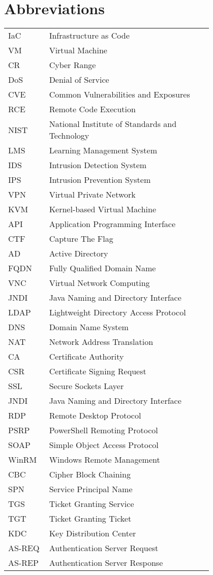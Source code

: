 \chapter*{Abbreviations}

\begin{flushleft}
\begin{tabular}{l p{0.8\linewidth}}
IaC      & Infrastructure as Code\\
VM       & Virtual Machine\\
CR       & Cyber Range\\
DoS      & Denial of Service\\
CVE      & Common Vulnerabilities and Exposures\\
RCE      & Remote Code Execution\\
NIST     & National Institute of Standards and Technology\\
LMS      & Learning Management System\\
IDS      & Intrusion Detection System\\
IPS      & Intrusion Prevention System\\
VPN      & Virtual Private Network\\
KVM      & Kernel-based Virtual Machine\\
API      & Application Programming Interface\\
CTF      & Capture The Flag\\
AD       & Active Directory\\
FQDN     & Fully Qualified Domain Name\\
VNC      & Virtual Network Computing\\
JNDI     & Java Naming and Directory Interface\\
LDAP     & Lightweight Directory Access Protocol\\
DNS      & Domain Name System\\
NAT      & Network Address Translation\\
CA       & Certificate Authority\\
CSR      & Certificate Signing Request\\
SSL      & Secure Sockets Layer\\
JNDI     & Java Naming and Directory Interface\\
RDP      & Remote Desktop Protocol\\
PSRP     & PowerShell Remoting Protocol\\
SOAP     & Simple Object Access Protocol\\
WinRM    & Windows Remote Management\\
CBC      & Cipher Block Chaining\\
SPN      & Service Principal Name\\
TGS      & Ticket Granting Service\\
TGT      & Ticket Granting Ticket\\
KDC      & Key Distribution Center\\
AS-REQ   & Authentication Server Request\\
AS-REP   & Authentication Server Response\\
\end{tabular}
\end{flushleft}